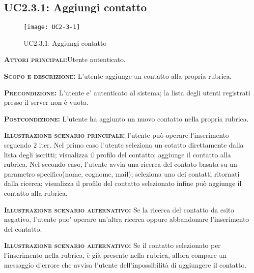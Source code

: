 \subsection{UC2.3.1: Aggiungi contatto}
\begin{figure}[h!]
\centering
\texttt{[image: UC2-3-1]}
\caption{UC2.3.1: Aggiungi contatto}\label{UC2.3.1}
\end{figure}
\begin{description}
\item{\scshape\bfseries Attori principali:}Utente autenticato.
\item{\scshape\bfseries Scopo e descrizione:} L'utente aggiunge un contatto alla propria rubrica.
\item{\scshape\bfseries Precondizione:} L'utente e' autenticato al sistema; la lista degli utenti registrati presso il server non è vuota.
\item{\scshape\bfseries Postcondizione:} L'utente ha aggiunto un nuovo contatto nella propria rubrica.
\item{\scshape\bfseries Illustrazione scenario principale:} l'utente può operare l'inserimento seguendo 2 iter. Nel primo caso l'utente seleziona un cotatto direttamente dalla lista degli iscritti; visualizza il profilo del contatto; aggiunge il contatto alla rubrica. Nel secondo caso, l'utente avvia una ricerca del contato basata su un parametro specifico(nome, cognome, mail); seleziona uno dei contatti ritornati dalla ricerca; visualizza il profilo del contatto selezionato infine può aggiunge il contatto alla rubrica.
\item{\scshape\bfseries Illustrazione scenario alternativo:} Se la ricerca del contatto da esito negativo, l'utente puo' operare un'altra ricerca oppure abbandonare l'inserimento del contatto.
\item{\scshape\bfseries Illustrazione scenario alternativo:} Se il contatto selezionato per l'inserimento nella rubrica, è già presente nella rubrica, allora compare un messaggio d'errore che avvisa l'utente dell'inpossibilità di aggiungere il contatto.
\end{description}

